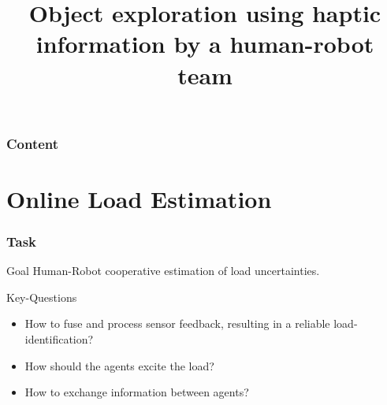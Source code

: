 \documentclass[student,noshadow]{ITRslides}
\title{Object exploration using haptic information by a human-robot team}
\begin{document}
\begin{frame}
    \titlepage
\end{frame}

\begin{frame}
	\frametitle{Content}
	\tableofcontents
\end{frame}

\section{Online Load Estimation}
\begin{frame}
	\frametitle{Task}
	\begin{block}{Goal}
			Human-Robot cooperative estimation of load uncertainties.
	\end{block}
	\vspace{2mm}
	\begin{block}{Key-Questions}
			\begin{itemize}
				\item How to fuse and process sensor feedback, resulting in a reliable load-identification?
				\item How should the agents excite the load?
				\item How to exchange information between agents?
			\end{itemize}	   
	\end{block}	
\end{frame}
\end{document}
